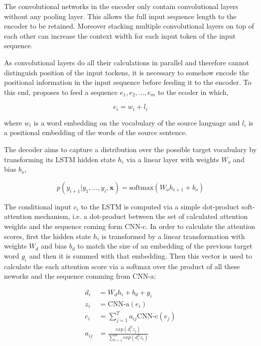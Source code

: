 \documentclass[a4paper]{article}
\begin{document}
The convolutional  networks in  the  encoder only  contain  convolutional layers
without  any  pooling layer. This allows the  full input  sequence length to the
encoder to be  retained. Moreover stacking multiple convolutional layers  on top
of  each other can increase  the context width for each input token of the input
sequence.

As convolutional  layers do all  their  calculations  in parallel  and therefore
cannot  distinguish  position of the input  tockens,  it is necessary to somehow
encode the positional information in the input sequence before feeding it to the
encoder. To this end, \citet{DBLP:journals/corr/GehringAGD16} proposes to feed a
sequence $e_1, e_2, ..., e_m$ to the ecoder in which,

\begin{equation*}
  e_i = w_i + l_i
\end{equation*}

where  $w_i$  is a word embedding on the vocabulary of the source  language  and
$l_i$ is a positional embedding of the words of the source sentence.

The decoder  aims to capture a  distribution over the possible target vocabulary
by  transforming its LSTM  hidden  state  $h_i$ via a linear layer  with weights
$W_o$ and bias $b_o$,

\begin{equation*}
  p(y_{i+1} \vert y_1, ..., y_i, \textbf{x}) =
  \text{softmax}(W_o h_{i + 1} + b_o)
\end{equation*}

The conditional  input  $c_i$ to the LSTM  is computed via  a simple dot-product
soft-attention  mechanism, i.e.  a  dot-product  between  the set of  calculated
attention weights and the sequence coming form CNN-c.  In  order to  calculate
the attention scores, first the hidden  state $h_i$  is transformed  by a linear
transformation  with weights  $W_d$  and bias $b_d$  to  match  the  size  of an
embedding of  the  previous  target word  $g_i$ and then it is summed  with that
embedding. Then this vector is used to calculate the  each attention score via a
softmax over  the product  of  all these  neworks and  the sequence comming from
CNN-a:

\begin{align*}
  d_i &= W_d h_i + b_d + g_i \\
  z_i &= \text{CNN-a}(e_i) \\
  c_i &= \sum_{j = 1}^{T}{a_{ij}\text{CNN-c}(e_j)} \\
  a_{ij} &= \frac{exp(d_i^T z_j)}{\sum_{t = 1}^{m}{exp(d_i^T z_t)}}
\end{align*}
\end{document}
